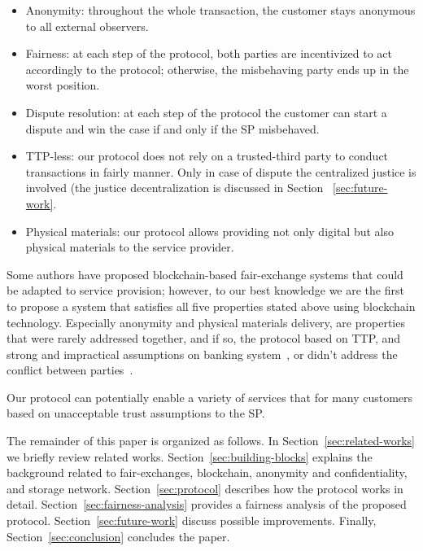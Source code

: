 \documentclass{ieeeaccess}
\begin{document}
\begin{itemize}
\item Anonymity:
throughout the whole transaction, the customer stays anonymous to all external observers.
\item Fairness:
at each step of the protocol, both parties are incentivized to act accordingly to the protocol; otherwise, the misbehaving party ends up in the worst position.
\item Dispute resolution: at each step of the protocol the customer can start a dispute and win the case if and only if the SP misbehaved.

\item TTP-less: 
our protocol does not rely on a trusted-third party to conduct transactions in fairly manner. Only in case of dispute   the centralized justice is involved (the justice decentralization is discussed in Section ~\ref{sec:future-work}.
\item Physical materials: our protocol allows providing not only digital but also physical materials to the service provider.
\end{itemize} 

Some authors have proposed blockchain-based fair-exchange systems that could be adapted to service provision; however, to our best knowledge we
are the first to propose a system that satisfies all five properties
stated above using blockchain technology. Especially anonymity and physical materials delivery, are
properties that were rarely addressed together, and if so, the protocol
based on TTP, and strong and impractical assumptions on banking system~\cite{birjoveanu2015anonymity}, or didn't address the conflict
between parties~\cite{altawy2017lelantos}.

Our protocol can potentially enable a variety of services that for many
customers based on unacceptable trust assumptions to the SP.

The remainder of this paper is organized as follows.
In Section~\ref{sec:related-works} we briefly review related works. 
Section~\ref{sec:building-blocks} explains the background related to fair-exchanges, blockchain, anonymity and confidentiality, and storage network. 
Section~\ref{sec:protocol} describes how the protocol works in detail.
Section~\ref{sec:fairness-analysis} provides a fairness analysis of the proposed protocol.
Section~\ref{sec:future-work} discuss possible improvements. 
Finally, Section~\ref{sec:conclusion} concludes the paper.
\end{document}
